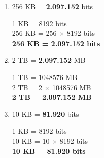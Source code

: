 \documentclass{article}
\begin{document}
\begin{enumerate}
    \item 256 KB = \textbf{2.097.152} bits
    
    1 KB = 8192 bits \\
    256 KB = 256 $\times$ 8192 bits \\
    \textbf{256 KB = 2.097.152 bits}

    \item 2 TB = \textbf{2.097.152} MB
    
    1 TB = 1048576 MB \\
    2 TB = 2 $\times$ 1048576 MB \\
    \textbf{2 TB = 2.097.152 MB}

    \item 10 KB = \textbf{81.920} bits
    
    1 KB = 8192 bits \\
    10 KB = 10 $\times$ 8192 bits \\
    \textbf{10 KB = 81.920 bits}
\end{enumerate}
\end{document}
